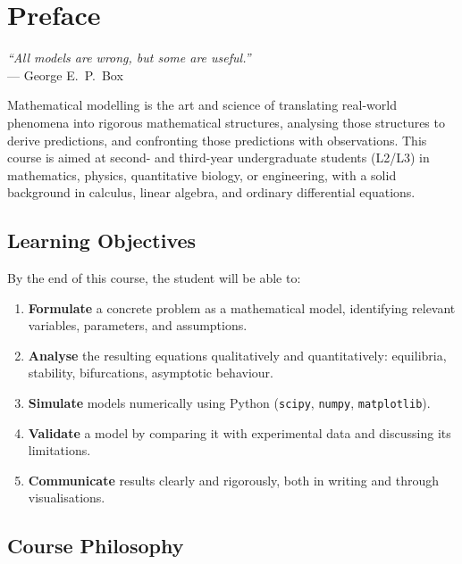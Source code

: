 \chapter*{Preface}

\begin{center}
\textit{``All models are wrong, but some are useful.''}\\[4pt]
--- George E.\ P.\ Box
\end{center}

\bigskip

Mathematical modelling is the art and science of translating real-world
phenomena into rigorous mathematical structures, analysing those structures
to derive predictions, and confronting those predictions with observations.
This course is aimed at second- and third-year undergraduate students (L2/L3)
in mathematics, physics, quantitative biology, or engineering, with a solid
background in calculus, linear algebra, and ordinary differential equations.

\section*{Learning Objectives}

By the end of this course, the student will be able to:

\begin{enumerate}
  \item \textbf{Formulate} a concrete problem as a mathematical model,
        identifying relevant variables, parameters, and assumptions.
  \item \textbf{Analyse} the resulting equations qualitatively and
        quantitatively: equilibria, stability, bifurcations, asymptotic
        behaviour.
  \item \textbf{Simulate} models numerically using Python
        (\texttt{scipy}, \texttt{numpy}, \texttt{matplotlib}).
  \item \textbf{Validate} a model by comparing it with experimental data
        and discussing its limitations.
  \item \textbf{Communicate} results clearly and rigorously, both in
        writing and through visualisations.
\end{enumerate}

\section*{Course Philosophy}

